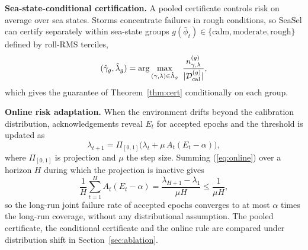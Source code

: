 \textbf{Sea-state-conditional certification.} A pooled certificate controls risk on average over sea states. Storms concentrate failures in rough conditions, so SeaSel can certify separately within sea-state groups $g(\bar\phi_t)\in\{\text{calm},\text{moderate},\text{rough}\}$ defined by roll-RMS terciles,
\begin{equation}\label{eq:mondrian}
(\hat\gamma_g,\hat\lambda_g)=\arg\max_{(\gamma,\lambda)\in\hat\Lambda_g}\ \frac{n^{(g)}_{\gamma,\lambda}}{|\mathcal D^{(g)}_{\rm cal}|},
\end{equation}
which gives the guarantee of Theorem~\ref{thm:cert} conditionally on each group.

\textbf{Online risk adaptation.} When the environment drifts beyond the calibration distribution, acknowledgements reveal $E_t$ for accepted epochs and the threshold is updated as
\begin{equation}\label{eq:online}
\lambda_{t+1}=\Pi_{[0,1]}\big(\lambda_t+\mu\,A_t(E_t-\alpha)\big),
\end{equation}
where $\Pi_{[0,1]}$ is projection and $\mu$ the step size. Summing (\ref{eq:online}) over a horizon $H$ during which the projection is inactive gives
\begin{equation}\label{eq:longrun}
\frac{1}{H}\sum_{t=1}^{H}A_t(E_t-\alpha)=\frac{\lambda_{H+1}-\lambda_1}{\mu H}\le\frac{1}{\mu H},
\end{equation}
so the long-run joint failure rate of accepted epochs converges to at most $\alpha$ times the long-run coverage, without any distributional assumption\cite{barber2023}. The pooled certificate, the conditional certificate and the online rule are compared under distribution shift in Section~\ref{sec:ablation}.
